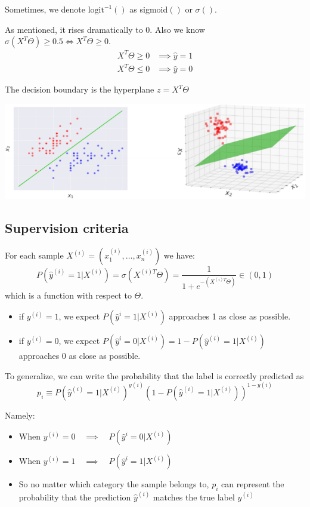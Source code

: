 \documentclass[letterpaper,12pt]{article}
\begin{document}
Sometimes, we denote $\text{logit}^{-1}()$ as sigmoid$()$ or $\sigma()$.

As mentioned, it rises dramatically to 0. Also we know $\sigma(X^T\Theta)\ge
    0.5 \iff X^T\Theta\ge0.$
\begin{align*}
    X^T\Theta\ge 0 & \implies \hat{y}=1 \\
    X^T\Theta\le 0 & \implies \hat{y}=0
\end{align*}

The decision boundary is the hyperplane $z=X^T\Theta$

\includegraphics{./Image/Boundary Hyperplane.png}

\subsection{Supervision criteria}

For each sample $X^{(i)}=({x_1^{(i)},\ldots,x_n^{(i)}})$ we have:
\[
    P(\hat{y}^{(i)}=1|X^{(i)})=\sigma(X^{(i)T}\Theta)=\frac{1}{1+e^{-(X^{(i)T}\Theta)}}\in(0,1)
\]
which is a function with respect to $\Theta$.

\begin{itemize}
    \item if $y^{(i)}=1$, we expect $P(\hat{y}^{i}=1|X^{(i)})$ approaches 1 as close as
          possible.
    \item if $y^{(i)}=0$, we expect
          $P(\hat{y}^{i}=0|X^{(i)})=1-P(\hat{y}^{(i)}=1|X^{(i)})$ approaches 0 as close
          as possible.
\end{itemize}

To generalize, we can write the probability that the label is correctly
predicted as
\[
    p_i\equiv P(\hat{y}^{(i)}=1|X^{(i)})^{y(i)}(1-P(\hat{y}^{(i)}=1|X^{(i)}))^{1-y(i)}
\]

Namely:
\begin{itemize}
    \item When $y^{(i)}=0\quad \implies \quad P(\hat{y}^{i}=0|X^{(i)})$
    \item When $y^{(i)}=1\quad \implies \quad P(\hat{y}^{i}=1|X^{(i)})$
    \item So no matter which category the sample belongs to, $p_i$ can represent
          the probability that the prediction $\hat{y}^{(i)}$ matches the true label
          $y^{(i)}$
\end{itemize}
\end{document}
